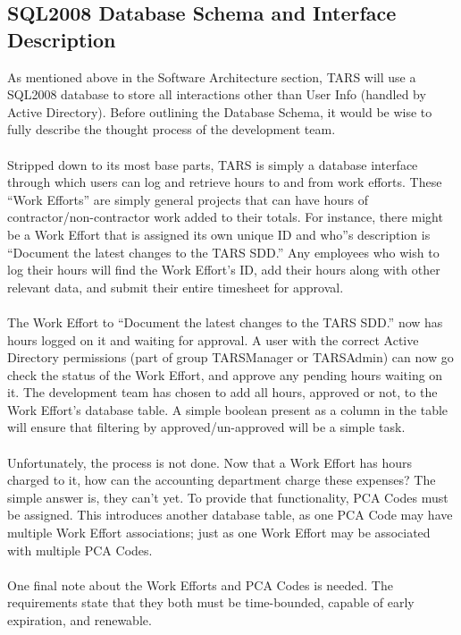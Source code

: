 \documentclass[letterpaper]{article}
\begin{document}
\subsection{SQL2008 Database Schema and Interface Description}
As mentioned above in the Software Architecture section, TARS will use a SQL2008 database to store all interactions other than User Info (handled by Active Directory). Before outlining the Database Schema, it would be wise to fully describe the thought process of the development team.\\
\\
Stripped down to its most base parts, TARS is simply a database interface through which users can log and retrieve hours to and from work efforts. These ``Work Efforts'' are simply general projects that can have hours of contractor/non-contractor work added to their totals. For instance, there might be a Work Effort that is assigned its own unique ID and who''s description is ``Document the latest changes to the TARS SDD.'' Any employees who wish to log their hours will find the Work Effort's ID, add their hours along with other relevant data, and submit their entire timesheet for approval. \\
\\
The Work Effort to ``Document the latest changes to the TARS SDD.'' now has hours logged on it and waiting for approval. A user with the correct Active Directory permissions (part of group TARSManager or TARSAdmin) can now go check the status of the Work Effort, and approve any pending hours waiting on it. The development team has chosen to add all hours, approved or not, to the Work Effort's database table. A simple boolean present as a column in the table will ensure that filtering by approved/un-approved will be a simple task.\\
\\
Unfortunately, the process is not done. Now that a Work Effort has hours charged to it, how can the accounting department charge these expenses? The simple answer is, they can't yet. To provide that functionality, PCA Codes must be assigned. This introduces another database table, as one PCA Code may have multiple Work Effort associations; just as one Work Effort may be associated with multiple PCA Codes.\\
\\
One final note about the Work Efforts and PCA Codes is needed. The requirements state that they both must be time-bounded, capable of early expiration, and renewable. \\
\end{document}
